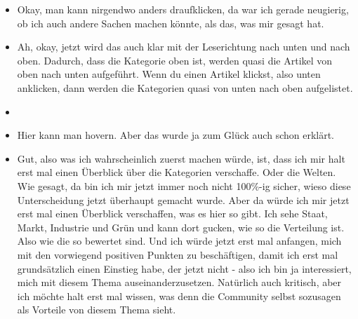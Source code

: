 {\begin{itemize}[]
                  Ich verstehe jetzt nicht sofort zu 100\% was gleich passieren wird, aber ich bin auch eher so der Typ, der sich eine Sache erst mal so oberflächlich durchliest, sage ich mal und dann einfach ausprobiert, was passiert.
                  Ich schätze mal, dass es da unterschiedliche Typen geben wird, also dass andere Leute da anders mit umgehen würden.
                  Aber ich bin jetzt nicht davor davon abgeschreckt, irgendwo drauf zu klicken, selbst wenn ich den Text jetzt nicht zu 100\% verstehe.
                  Aber wie gesagt, also zu 100\% verstehe ich jetzt nicht, was passieren wird.
                  Ich denke mir dann, dass ich das gleich einfach sehen werde.
            \item {} Okay, man kann nirgendwo anders draufklicken, da war ich gerade neugierig, ob ich auch andere Sachen machen könnte, als das, was mir gesagt hat.
            \item {} Ah, okay, jetzt wird das auch klar mit der Leserichtung nach unten und nach oben.
                  Dadurch, dass die Kategorie oben ist, werden quasi die Artikel von oben nach unten aufgeführt.
                  Wenn du einen Artikel klickst, also unten anklicken, dann werden die Kategorien quasi von unten nach oben aufgelistet.
            \item {}
            \item {} Hier kann man hovern.
                  Aber das wurde ja zum Glück auch schon erklärt.
            \item {} Gut, also was ich wahrscheinlich zuerst machen würde, ist, dass ich mir halt erst mal einen Überblick über die Kategorien verschaffe.
                  Oder die Welten.
                  Wie gesagt, da bin ich mir jetzt immer noch nicht 100\%-ig sicher, wieso diese Unterscheidung jetzt überhaupt gemacht wurde.
                  Aber da würde ich mir jetzt erst mal einen Überblick verschaffen, was es hier so gibt.
                  Ich sehe Staat, Markt, Industrie und Grün und kann dort gucken, wie so die Verteilung ist.
                  Also wie die so bewertet sind.
                  Und ich würde jetzt erst mal anfangen, mich mit den vorwiegend positiven Punkten zu beschäftigen, damit ich erst mal grundsätzlich einen Einstieg habe, der jetzt nicht - also ich bin ja interessiert, mich mit diesem Thema auseinanderzusetzen.
                  Natürlich auch kritisch, aber ich möchte halt erst mal wissen, was denn die Community selbst sozusagen als Vorteile von diesem Thema sieht.

\end{itemize}}
